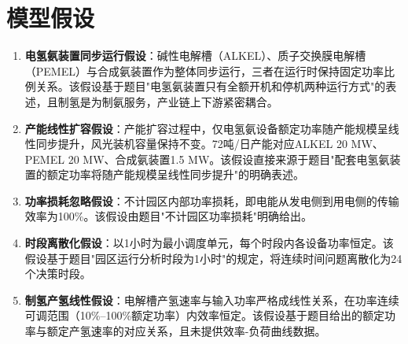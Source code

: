 \section{模型假设}

\begin{enumerate}
\item \textbf{电氢氨装置同步运行假设}：碱性电解槽（ALKEL）、质子交换膜电解槽（PEMEL）与合成氨装置作为整体同步运行，三者在运行时保持固定功率比例关系。该假设基于题目"电氢氨装置只有全额开机和停机两种运行方式"的表述，且制氢是为制氨服务，产业链上下游紧密耦合。

\item \textbf{产能线性扩容假设}：产能扩容过程中，仅电氢氨设备额定功率随产能规模呈线性同步提升，风光装机容量保持不变。72吨/日产能对应ALKEL 20 MW、PEMEL 20 MW、合成氨装置1.5 MW。该假设直接来源于题目"配套电氢氨装置的额定功率将随产能规模呈线性同步提升"的明确表述。

\item \textbf{功率损耗忽略假设}：不计园区内部功率损耗，即电能从发电侧到用电侧的传输效率为100\%。该假设由题目"不计园区功率损耗"明确给出。

\item \textbf{时段离散化假设}：以1小时为最小调度单元，每个时段内各设备功率恒定。该假设基于题目"园区运行分析时段为1小时"的规定，将连续时间问题离散化为24个决策时段。

\item \textbf{制氢产氢线性假设}：电解槽产氢速率与输入功率严格成线性关系，在功率连续可调范围（10\%--100\%额定功率）内效率恒定。该假设基于题目给出的额定功率与额定产氢速率的对应关系，且未提供效率-负荷曲线数据。
\end{enumerate}
